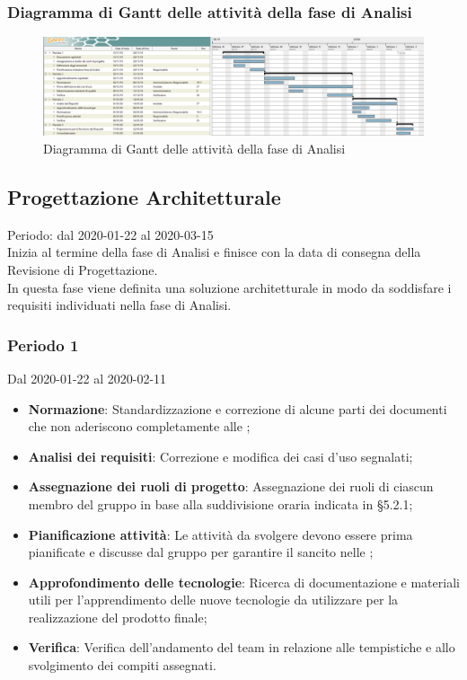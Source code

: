 \newpage
\begin{landscape}
\subsubsection{Diagramma di Gantt delle attività della fase di Analisi}
\pagestyle{empty}
\begin{figure}[h]
	\centering	
	\includegraphics[scale=0.455]{Sezioni/DiagrammiGantt/Analisi.png}
	\caption{Diagramma di Gantt delle attività della fase di Analisi}
\end{figure}
\end{landscape}
\clearpage

\subsection{Progettazione Architetturale}
Periodo: dal 2020-01-22 al 2020-03-15\\
Inizia al termine della fase di Analisi e finisce con la data di consegna della Revisione di Progettazione.\\
In questa fase viene definita una soluzione architetturale in modo da soddisfare i requisiti individuati nella fase di Analisi.

\subsubsection{Periodo 1} 
Dal 2020-01-22 al 2020-02-11
\begin{itemize}
	\item \textbf{Normazione}: Standardizzazione e correzione di alcune parti dei documenti che non aderiscono completamente alle \NdP{};
	\item \textbf{Analisi dei requisiti}: Correzione e modifica dei casi d'uso segnalati;
	\item \textbf{Assegnazione dei ruoli di progetto}: Assegnazione dei ruoli di ciascun membro del gruppo in base alla suddivisione oraria indicata in §5.2.1;
	\item \textbf{Pianificazione attività}: Le attività da svolgere devono essere prima pianificate e discusse dal gruppo per garantire il  sancito nelle \NdP{};
	\item \textbf{Approfondimento delle tecnologie}: Ricerca di documentazione e materiali utili per l'apprendimento delle nuove tecnologie da utilizzare per la realizzazione del prodotto finale;
	\item \textbf{Verifica}: Verifica dell'andamento del team in relazione alle tempistiche e allo svolgimento dei compiti assegnati.
\end{itemize}
